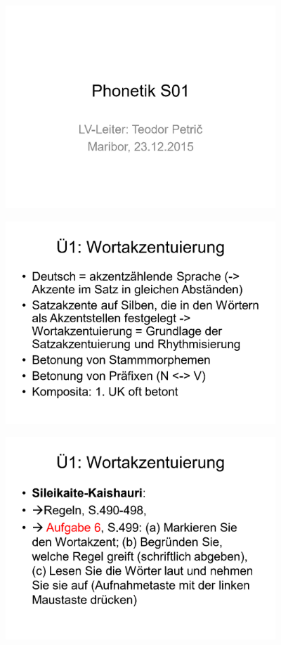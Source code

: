 \documentclass[
  letterpaper,
]{scrbook}
\begin{document}
\includegraphics[width=4in,height=\textheight]{./pictures/sprachlabor/Phonetikuebungen_S01_Page1.png}

\includegraphics[width=4in,height=\textheight]{./pictures/sprachlabor/Phonetikuebungen_S01_Page2.png}

\includegraphics[width=4in,height=\textheight]{./pictures/sprachlabor/Phonetikuebungen_S01_Page3.png}
\end{document}
